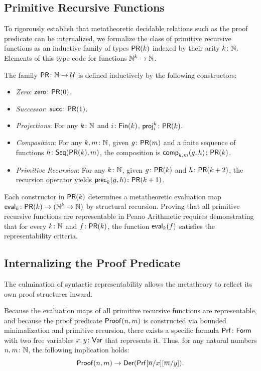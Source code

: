 \subsection{Primitive Recursive Functions}

To rigorously establish that metatheoretic decidable relations such as the proof predicate can be internalized, we formalize the class of primitive recursive functions as an inductive family of types $\mathsf{PR}(k)$ indexed by their arity $k\colon\N$. Elements of this type code for functions $\mathbb{N}^k\to\mathbb{N}$.

\begin{defn}
 The family $\fun{PR}\colon\N\to\univ$ is defined inductively by the following constructors:
 \begin{itemize}
 \item \textsl{Zero}: $\fun{zero}\colon\fun{PR}(0)$.
 \item \textsl{Successor}: $\fun{succ}\colon\fun{PR}(1)$.
 \item \textsl{Projections}: For any $k\colon\N$ and $i\colon\fun{Fin}(k)$, $\fun{proj}_i^k\colon\fun{PR}(k)$.
 \item \textsl{Composition}: For any $k, m\colon\N$, given $g\colon\fun{PR}(m)$ and a finite sequence of functions $h\colon\fun{Seq}(\fun{PR}(k), m)$, the composition is $\fun{comp}_{k,m}(g, h)\colon\fun{PR}(k)$.
 \item \textsl{Primitive Recursion}: For any $k\colon\N$, given $g\colon\fun{PR}(k)$ and $h\colon\fun{PR}(k+2)$, the recursion operator yields $\fun{prec}_k(g, h)\colon\fun{PR}(k+1)$.
 \end{itemize}
\end{defn}

\begin{rem}
 Each constructor in $\mathsf{PR}(k)$ determines a metatheoretic evaluation map $\fun{eval}_k\colon\fun{PR}(k)\to(\N^k\to\N)$ by structural recursion. Proving that all primitive recursive functions are representable in Peano Arithmetic requires demonstrating that for every $k\colon\N$ and $f\colon\fun{PR}(k)$, the function $\mathsf{eval}_k(f)$ satisfies the representability criteria.
\end{rem}

\subsection{Internalizing the Proof Predicate}

The culmination of syntactic representability allows the metatheory to reflect its own proof structures inward. 

\begin{thm}
 Because the evaluation maps of all primitive recursive functions are representable, and because the proof predicate\/ $\mathsf{Proof}(n,m)$ is constructed via bounded minimalization and primitive recursion, there exists a specific formula\/ $\fun{Prf}\colon\fun{Form}$ with two free variables\/ $x,y\colon\fun{Var}$ that represents it. Thus, for any natural numbers\/ $n,m\colon\N$, the following implication holds:
 \[
 \mathsf{Proof}(n,m) \to \mathsf{Der}(\mathsf{Prf}[{\overline{n}}/x][{\overline{m}}/y]).
 \]
\end{thm}